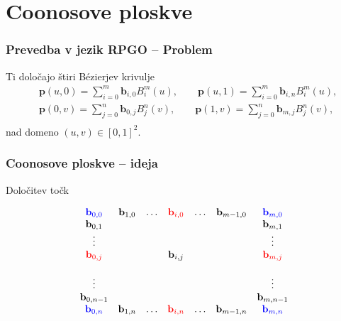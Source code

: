 \documentclass{beamer}
\begin{document}
\section{Coonosove ploskve}

\begin{frame}
    \frametitle{Prevedba v jezik RPGO -- Problem}
\begin{block}{Ti določajo štiri Bézierjev krivulje}
    \begin{align*}
        &\mathbf{p}(u,0) =\sum_{i=0}^m \mathbf{b}_{i,0} B_i^m(u), \qquad
        \mathbf{p}(u,1) =\sum_{i=0}^m \mathbf{b}_{i,n} B_i^m(u),  \\
        &\mathbf{p}(0,v) =\sum_{j=0}^n \mathbf{b}_{0,j} B_j^n(v), \qquad
        \mathbf{p}(1,v) =\sum_{j=0}^n \mathbf{b}_{m,j} B_j^n(v),  \\
    \end{align*}    
    nad domeno $(u,v) \in [0,1]^2.$
\end{block}



\end{frame}



\begin{frame}
    \frametitle{Coonosove ploskve -- ideja}
    \begin{block}{Določitev točk}
    
    $$
    \begin{matrix}
        \color{blue} \mathbf{b}_{0,0}  &\mathbf{b}_{1,0} & \ldots & \color{red} \mathbf{b}_{i,0} & \ldots &\mathbf{b}_{m-1,0}  &\color{blue} \mathbf{b}_{m,0} \\
       \mathbf{b}_{0,1}  &                 &        & &      &                   &\mathbf{b}_{m,1} \\
       \vdots            &                 &        & &     &                   &  \vdots\\
       \color{red} \mathbf{b}_{0,j}                 &                 &        & \mathbf{b}_{i,j} &  &   & \color{red} \mathbf{b}_{m,j} \\                  &  \\
       \vdots            &                 &        & &    &                   & \vdots \\
       \mathbf{b}_{0,n-1} &                &         & &     &                    &\mathbf{b}_{m,n-1} \\ 
       \color{blue} \mathbf{b}_{0,n}  &\mathbf{b}_{1,n} & \ldots  & \color{red} \mathbf{b}_{i,n} & \ldots  &\mathbf{b}_{m-1,n} &\color{blue} \mathbf{b}_{m,n} 
    \end{matrix}
    $$
\end{block}
    
\end{frame}
\end{document}
